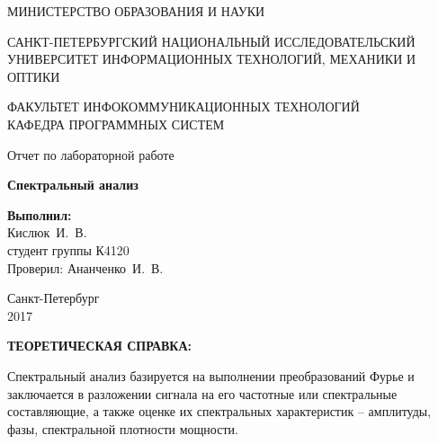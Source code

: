 \documentclass[14pt,a4paper]{extreport}
\newcommand{\header}[1]{%
{
\clearpage%
\fontsize{16pt}{14pt}\selectfont
\begin{center}
\textbf{\MakeUppercase{#1}:}
\end{center}
}
}
\newcommand{\labyear}{2017}
\newcommand{\labtitle}{Спектральный анализ}
\newcommand{\prepod}{Ананченко~И.~В.}
\newcommand{\student}{Кислюк~И.~В.}
\begin{document}
	\begin{titlepage}
	\begin{center}	
		\fontsize{14pt}{14pt}\selectfont
		МИНИСТЕРСТВО ОБРАЗОВАНИЯ И НАУКИ\\

		\vspace*{0.6\baselineskip}

		\MakeUppercase{Санкт-Петербургский Национальный Исследовательский Университет Информационных технологий, механики и оптики}		
		
		\vspace*{0.6\baselineskip}
		\MakeUppercase{Факультет Инфокоммуникационных технологий}\\
		\MakeUppercase{Кафедра программных систем}
	
		\vspace*{7\baselineskip}
		\fontsize{19pt}{18pt}\selectfont
		Отчет по лабораторной работе
		
		\fontsize{20pt}{18pt}\selectfont
		\textbf{\labtitle}\\
		\vspace*{1.15\baselineskip}
		\end{center}
	
	\vspace*{2\baselineskip}
	\begin{flushright}
	\fontsize{14pt}{14pt}\selectfont
	\textbf{Выполнил:}\\
	\student\\
	студент группы К4120\\
	Проверил: \prepod\\
	\end{flushright}
	
	\vspace{\fill}
	\begin{center}
	Санкт-Петербург\\
	\vspace{-1ex}
	\labyear
	\end{center}
	
\end{titlepage}

\fontsize{14pt}{14pt}\selectfont

\header{Теоретическая справка}

Спектральный анализ базируется на выполнении преобразований Фурье и заключается в разложении сигнала на его частотные или спектральные составляющие, а также оценке их спектральных характеристик – амплитуды, фазы, спектральной плотности мощности.
\end{document}
